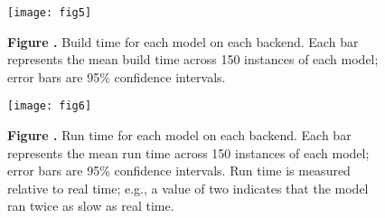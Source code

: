 \documentclass{frontiersSCNS}
\begin{document}
\begin{figure}[!ht]
\begin{center}
  \texttt{[image: fig5]}
\end{center}
\textbf{\label{fig:05} Figure .}
       {Build time for each model on each backend. Each bar represents
         the mean build time across 150 instances of each model;
         error bars are 95\% confidence intervals.}
\end{figure}

\begin{figure}[!ht]
\begin{center}
  \texttt{[image: fig6]}
\end{center}
\textbf{\label{fig:06} Figure .}
       {Run time for each model on each backend. Each bar represents
         the mean run time across 150 instances of each model;
         error bars are 95\% confidence intervals.
         Run time is measured relative to real time;
         e.g., a value of two indicates that the model ran twice as slow
         as real time.}
\end{figure}
\end{document}
